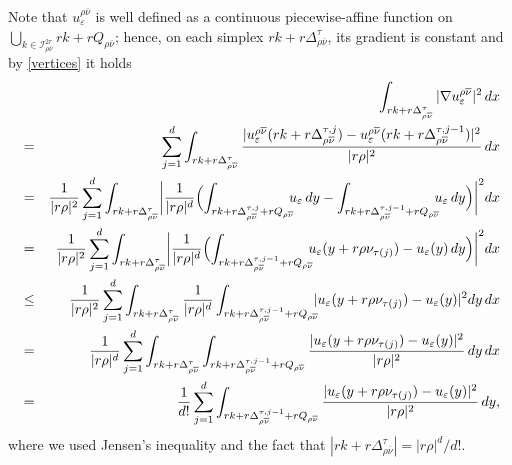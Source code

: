 \documentclass[11pt,a4paper,reqno]{amsart}
\theoremstyle{plain}
\theoremstyle{definition}
\newcommand\e{\varepsilon}
\theoremstyle{remark}
\begin{document}
  
Note that $u_\e^{\rho\overline{\nu}}$ is well defined as a continuous piecewise-affine function on $\bigcup_{k\in \mathcal{I}^{2r}_{\rho\overline{\nu}}} rk+rQ_{\rho\overline{\nu}}$; hence, on each simplex $rk+r\Delta_{\rho\overline{\nu}}^\tau$, its gradient is constant and by \eqref{vertices} it holds
\begin{eqnarray*} %
\nonumber
    &&\hskip-1.5cm\int_{rk+r\Delta_{\rho\overline{\nu}}^\tau} |\nabla u_\e^{\rho\overline{\nu}}|^2\,dx \\
    &=& \sum_{j=1}^d \int_{rk+r\Delta_{\rho\overline{\nu}}^\tau} \frac{|u_\e^{\rho\overline{\nu}}(rk+r\Delta_{\rho\overline{\nu}}^{\tau,j})-u_\e^{\rho\overline{\nu}}(rk+r\Delta_{\rho\overline{\nu}}^{\tau,j-1})|^2}{|r\rho|^2}\,dx      \\ \nonumber
    &=& \frac{1}{|r\rho|^2}\sum_{j=1}^d \int_{rk+r\Delta_{\rho\overline{\nu}}^\tau} \biggl|\frac{1}{|r\rho|^d}\Bigl(\int_{rk+r\Delta_{\rho\overline{\nu}}^{\tau,j}+rQ_{\rho\overline{\nu}}}\hspace{-0.2cm}u_\e\, dy-\int_{rk+r\Delta_{\rho\overline{\nu}}^{\tau,j-1}+rQ_{\rho\overline{\nu}}}\hspace{-0.2cm} u_\e\, dy \Bigr)\biggr|^2dx \\ \nonumber
    &=& \frac{1}{|r\rho|^2}\sum_{j=1}^d \int_{rk+r\Delta_{\rho\overline{\nu}}^\tau} \biggl| \frac{1}{|r\rho|^d}\Bigl(\int_{rk+r\Delta_{\rho\overline{\nu}}^{\tau,j-1}+rQ_{\rho\overline{\nu}}} \hspace{-0.2cm} u_\e(y+r\rho\nu_{\tau(j)})-u_\e(y)\, dy\Bigr)\biggr|^2 dx \\ \nonumber
    &\leq& \frac{1}{|r\rho|^2}\sum_{j=1}^d \int_{rk+r\Delta_{\rho\overline{\nu}}^\tau} \frac{1}{|r\rho|^d}\int_{rk+r\Delta_{\rho\overline{\nu}}^{\tau,j-1}+rQ_{\rho\overline{\nu}}} \hspace{-0.2cm} |u_\e(y+r\rho\nu_{\tau(j)})-u_\e(y)|^2 dy\,dx \\ \nonumber  
    &=& \frac{1}{|r\rho|^d}\sum_{j=1}^d \int_{rk+r\Delta_{\rho\overline{\nu}}^\tau} \int_{rk+r\Delta_{\rho\overline{\nu}}^{\tau,j-1}+rQ_{\rho\overline{\nu}}} \frac{|u_\e(y+r\rho\nu_{\tau(j)})-u_\e(y)|^2}{|r\rho|^2}\, dy\,dx \\ 
    &=& \frac{1}{d!} \sum_{j=1}^d \int_{rk+r\Delta_{\rho\overline{\nu}}^{\tau,j-1}+rQ_{\rho\overline{\nu}}} \frac{|u_\e(y+r\rho\nu_{\tau(j)})-u_\e(y)|^2}{|r\rho|^2}\, dy,
\end{eqnarray*}
where we used Jensen's inequality and the fact that $|rk+r\Delta_{\rho\overline{\nu}}^\tau|=|r\rho|^d/d!$.
\end{document}
